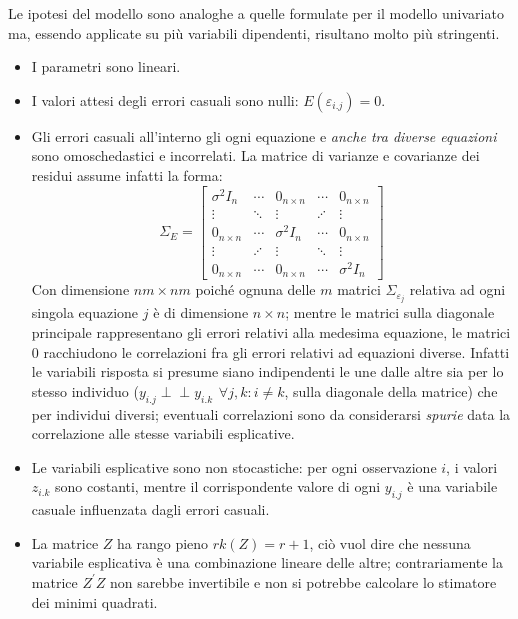 \documentclass[a4page, 11pt]{article} %
\def\indep{\perp \!\!\! \perp }   %
\begin{document}
Le ipotesi del modello sono analoghe a quelle formulate per il modello univariato ma, essendo applicate su più variabili dipendenti, risultano molto più stringenti.
\begin{itemize}[noitemsep]
\item I parametri sono lineari.
\item I valori attesi degli errori casuali sono nulli: $E(\varepsilon_{i.j}) = 0$.
\item Gli errori casuali all’interno gli ogni equazione e \textit{anche tra diverse equazioni} sono omoschedastici e incorrelati.
  La matrice di varianze e covarianze dei residui assume infatti la forma:
\begin{equation*}
  \Sigma_E =
  \begin{bmatrix}
    \sigma^2 I_n   & \cdots  & 0_{n \times n} & \cdots  & 0_{n \times n} \\
    \vdots         & \ddots  & \vdots         & \iddots & \vdots \\
    0_{n \times n} & \cdots  & \sigma^2 I_n   & \cdots  & 0_{n \times n} \\
    \vdots         & \iddots & \vdots         & \ddots  & \vdots \\
    0_{n \times n} & \cdots  & 0_{n \times n} & \cdots  & \sigma^2 I_n 
  \end{bmatrix}
\end{equation*}
Con dimensione $nm \times nm$ poiché ognuna delle $m$ matrici $\Sigma_{\varepsilon_j}$ relativa ad ogni singola equazione $j$ è di dimensione $n \times n$; mentre le matrici sulla diagonale principale rappresentano gli errori relativi alla medesima equazione, le matrici $0$ racchiudono le correlazioni fra gli errori relativi ad equazioni diverse.
Infatti le variabili risposta si presume siano indipendenti le une dalle altre sia per lo stesso individuo ($y_{i.j} \indep y_{i.k} \hspace{5pt} \forall j, k : i \ne k$, sulla diagonale della matrice) che per individui diversi; eventuali correlazioni sono da considerarsi \textit{spurie} data la correlazione alle stesse variabili esplicative.
\item Le  variabili esplicative sono non stocastiche: per ogni osservazione $i$, i valori $z_{i.k}$ sono costanti, mentre il corrispondente valore di ogni $y_{i.j}$ è una variabile casuale influenzata dagli errori casuali.
\item La matrice $Z$ ha rango pieno $rk(Z) = r + 1$, ciò vuol dire che nessuna variabile esplicativa è una combinazione lineare delle altre; contrariamente la matrice $Z^{\prime}Z$ non sarebbe invertibile e non si potrebbe calcolare lo stimatore dei minimi quadrati.

\end{itemize}
\end{document}
